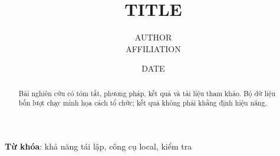 \documentclass{article}
\title{{{TITLE}}}
\author{{{AUTHOR}} \\ {{AFFILIATION}}}
\date{{{DATE}}}
\begin{document}
\maketitle
\begin{abstract}Bài nghiên cứu có tóm tắt, phương pháp, kết quả và tài liệu tham khảo. Bộ dữ liệu bốn lượt chạy minh họa cách tổ chức; kết quả không phải khẳng định hiệu năng.\end{abstract}
\textbf{Từ khóa}: khả năng tái lập, công cụ local, kiểm tra





\end{document}
